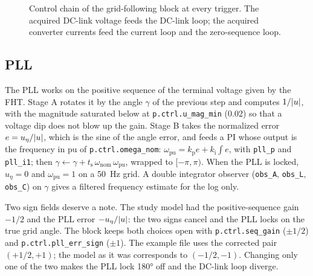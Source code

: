 \documentclass[11pt,a4paper]{scrartcl}
\newcommand{\ped}[1]{_{\mathrm{#1}}}
\newcommand{\code}[1]{\texttt{#1}}
\begin{document}
\begin{onehalfspace}
\begin{figure}[htbp]
{}
	\captionsetup{width=0.9\textwidth, font=small}
	\caption[Control chain of the grid-following block.]{Control chain of the grid-following block at every trigger. The acquired DC-link voltage feeds the DC-link loop; the acquired converter currents feed the current loop and the zero-sequence loop.}
	\label{fig:gfl_chain}
\end{figure}

\subsection{PLL}
\label{sec:pll}

The PLL works on the positive sequence of the terminal voltage given by the FHT. Stage A rotates it by the angle $\gamma$ of the previous step and computes $1/\abs{u}$, with the magnitude saturated below at \code{p.ctrl.u\_mag\_min} (0.02) so that a voltage dip does not blow up the gain. Stage B takes the normalized error $e = u_\eta/\abs{u}$, which is the sine of the angle error, and feeds a PI whose output is the frequency in pu of \code{p.ctrl.omega\_nom}: $\omega\ped{pu} = k\ped{p} e + k\ped{i} \int e$, with \code{pll\_p} and \code{pll\_i1}; then $\gamma \leftarrow \gamma + t\ped{s}\, \omega\ped{nom}\, \omega\ped{pu}$, wrapped to $[-\pi, \pi)$. When the PLL is locked, $u_\eta = 0$ and $\omega\ped{pu} = 1$ on a \SI{50}{\hertz} grid. A double integrator observer (\code{obs\_A}, \code{obs\_L}, \code{obs\_C}) on $\gamma$ gives a filtered frequency estimate for the log only.

Two sign fields deserve a note. The study model had the positive-sequence gain $-1/2$ and the PLL error $-u_\eta/\abs{u}$: the two signs cancel and the PLL locks on the true grid angle. The block keeps both choices open with \code{p.ctrl.seq\_gain} ($\pm 1/2$) and \code{p.ctrl.pll\_err\_sign} ($\pm 1$). The example file uses the corrected pair $(+1/2, +1)$; the model as it was corresponds to $(-1/2, -1)$. Changing only one of the two makes the PLL lock \ang{180} off and the DC-link loop diverge.


\end{onehalfspace}
\end{document}
